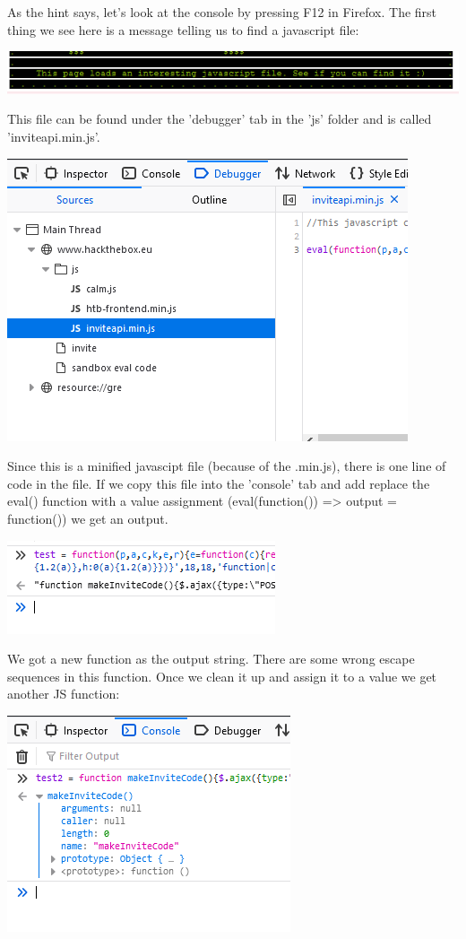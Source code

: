 \documentclass[../main.tex]{subfiles}
\begin{document}
As the hint says, let's look at the console by pressing F12 in Firefox. The first thing we see here is a message telling us to find a javascript file:

\includegraphics[width=\linewidth]{images/hackthebox_hint2.png}

This file can be found under the 'debugger' tab in the 'js' folder and is called 'inviteapi.min.js'.

\begin{center}
    \includegraphics[width=0.5\linewidth]{images/hackthebox_js.png}
\end{center}

Since this is a minified javascipt file (because of the .min.js), there is one line of code in the file. If we copy this file into the 'console' tab and add replace the eval() function with a value assignment (eval(function()) => output = function()) we get an output.

\begin{center}
    \includegraphics[width=0.5\linewidth]{images/hackthebox_js2.png}
\end{center}

We got a new function as the output string. There are some wrong escape sequences in this function. Once we clean it up and assign it to a value we get another JS function:

\begin{center}
    \includegraphics[width=0.5\linewidth]{images/hackthebox_js3.PNG}
\end{center}
\end{document}
